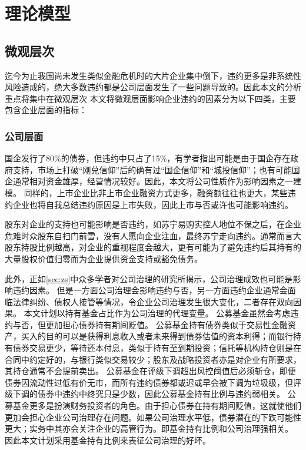 
\chapter{理论模型}
\section{微观层次}
迄今为止我国尚未发生类似金融危机时的大片企业集中倒下，违约更多是非系统性风险造成的，绝大多数违约都是公司层面发生了一些问题导致的。因此本文的分析重点将集中在微观层次
本文将微观层面影响企业违约的因素分为以下四类，主要包含企业层面的指标：
\subsection{公司层面}

国企发行了80\%的债券，但违约中只占了15\%，有学者指出可能是由于国企存在政府支持\cite{mo2021china}，市场上打破“刚兑信仰”后的确有过“国企信仰”和“城投信仰”；也有可能国企通常相对资金雄厚，经营情况较好。因此，本文将公司性质作为影响因素之一建模。
同样的，上市企业比非上市企业融资方式更多，融资额往往也更大，某些违约企业也将自我总结违约原因是上市失败，因此上市与否或许也可能影响违约。

股东对企业的支持也可能影响是否违约，如苏宁易购实控人地位不保之后，在企业危难时众股东自扫门前雪，没有人愿向企业注血，最终苏宁走向违约。通常而言大股东持股比例越高，对企业的重视程度会越大，更有可能为了避免违约后其持有的大量股权价值归零而为企业提供资金支持或豁免债务。

此外，正如\ref{sec:zs}中众多学者对公司治理的研究所揭示，公司治理成效也可能是影响违约因素。
但是一方面公司治理会影响违约与否，另一方面违约企业通常会面临法律纠纷、债权人接管等情况，令企业公司治理发生很大变化，二者存在双向因果。
本文计划以持有基金占比作为公司治理的代理变量。
公募基金虽然会考虑违约与否，但更加担心债券持有期间贬值。
公募基金持有债券类似于交易性金融资产，买入的目的可以是获得利息收入或者未来得到债券估值的资本利得；而银行持有债券交易更少，等待还本付息，类似于持有至到期投资；信托等机构持仓则是在合同中约定好的，与银行类似交易较少；股东及战略投资者亦是对企业有所要求，其持仓通常不会提前卖出。
公募基金在评级下调超出风控阈值后必须斩仓，即便债券因流动性过低有价无市，而所有违约债券都或迟或早会被下调为垃圾级，但评级下调的债券中违约中终究只是少数，因此公募基金持有比例与违约弱相关。
公募基金更多是扮演财务投资者的角色。由于担心债券在持有期间贬值，这就使他们更加会担心企业公司治理存在问题。如果公司治理水平低，债券潜在的下跌可能性更大\Parencite{anginer2018corporate}；实务中其亦会关注企业的高管行为。即基金持有比例和公司治理强相关。
因此本文计划采用基金持有比例来表征公司治理的好坏。

